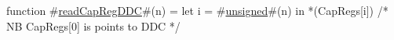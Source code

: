 function #\hyperref[zreadCapRegDDC]{readCapRegDDC}#(n) =
  let i = #\hyperref[zunsigned]{unsigned}#(n) in
  *(CapRegs[i]) /* NB CapRegs[0] is points to DDC */
